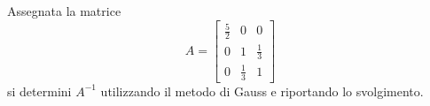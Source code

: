 Assegnata la matrice
\[
A=\left[ \begin{array}{ccc}
\frac{5}{2} & 0 & 0 \\
0 & 1 & \frac{1}{3} \\
0 & \frac{1}{3} & 1 \end{array} \right]
\]
si determini $A^{-1}$ utilizzando il metodo di Gauss e riportando 
lo svolgimento. \\

